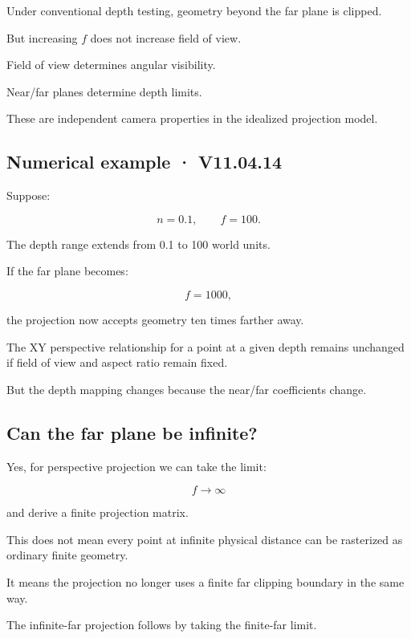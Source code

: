 Under conventional depth testing, geometry beyond the far plane is clipped.

But increasing \(f\) does not increase field of view.

Field of view determines angular visibility.

Near/far planes determine depth limits.

These are independent camera properties in the idealized projection model.

\subsection{Numerical example · V11.04.14}\label{02-foundations-ii-ch033-numerical-example-v11.04.14}

\hypertarget{02-foundations-ii-ch033-numerical-example-v11.04.14}{}

Suppose:

\[
 n=0.1,\qquad f=100.
\]

The depth range extends from 0.1 to 100 world units.

If the far plane becomes:

\[
 f=1000,
\]

the projection now accepts geometry ten times farther away.

The XY perspective relationship for a point at a given depth remains unchanged if field of view and aspect ratio remain fixed.

But the depth mapping changes because the near/far coefficients change.

\subsection{Can the far plane be infinite?}\label{02-foundations-ii-ch033-can-the-far-plane-be-infinite}

\hypertarget{02-foundations-ii-ch033-can-the-far-plane-be-infinite}{}

Yes, for perspective projection we can take the limit:

\[
 f\to\infty
\]

and derive a finite projection matrix.

This does not mean every point at infinite physical distance can be rasterized as ordinary finite geometry.

It means the projection no longer uses a finite far clipping boundary in the same way.

The infinite-far projection follows by taking the finite-far limit.

